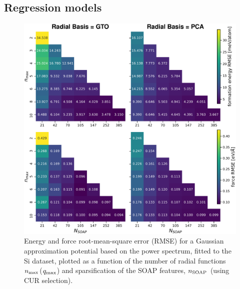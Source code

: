 \subsection{Regression models}


\begin{figure}[b]
    \centering
        \includegraphics[width=\linewidth]{fig/optbasis/si-nmax_vs_feat-rs-cur-combo.pdf}
    \caption{Energy and force root-mean-square error (RMSE) for a Gaussian approximation potential based on the power spectrum, fitted to the Si dataset, plotted as a function of the number of radial functions $n_\mathrm{max}$($q_\mathrm{max}$) and sparsification of the SOAP features, ${n_\mathrm{SOAP}}$ (using CUR selection).}
    \label{fig:si-nmax_vs_feat-rs-rmse}
\end{figure}

